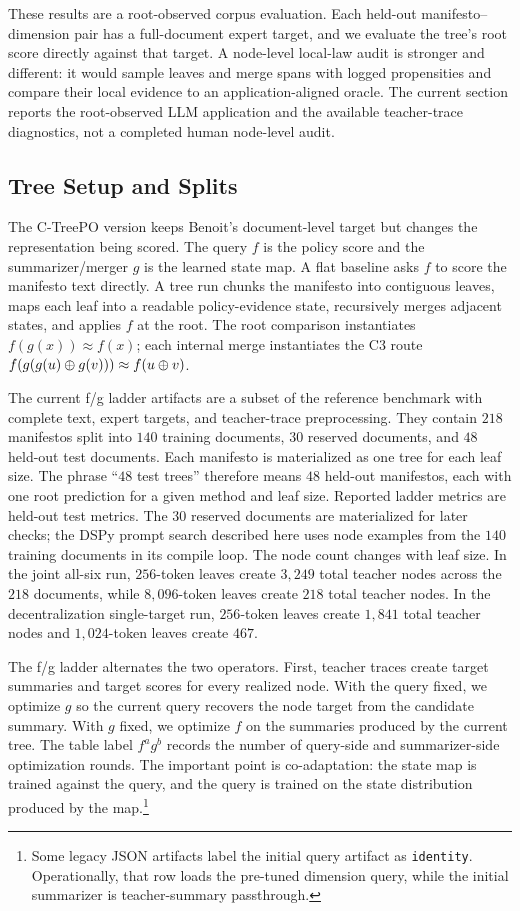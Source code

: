 These results are a root-observed corpus evaluation. Each held-out
manifesto--dimension pair has a full-document expert target, and we evaluate
the tree's root score directly against that target. A node-level local-law
audit is stronger and different: it would sample leaves and merge spans with
logged propensities and compare their local evidence to an application-aligned
oracle. The current section reports the root-observed LLM application and the
available teacher-trace diagnostics, not a completed human node-level audit.

\subsection{Tree Setup and Splits}\label{sec:min-manifesto-tree-setup}

The C-TreePO version keeps Benoit's document-level target but changes the
representation being scored. The query $f$ is the policy score and the
summarizer/merger $g$ is the learned state map. A flat baseline asks $f$ to
score the manifesto text directly. A tree run chunks the manifesto into
contiguous leaves, maps each leaf into a readable policy-evidence state,
recursively merges adjacent states, and applies $f$ at the root. The root
comparison instantiates $f(g(x))\approx f(x)$; each internal merge
instantiates the C3 route
$f(g(g(u)\oplus g(v)))\approx f(u\oplus v)$.

The current f/g ladder artifacts are a subset of the reference benchmark with
complete text, expert targets, and teacher-trace preprocessing. They contain
$218$ manifestos split into $140$ training documents, $30$ reserved documents,
and $48$ held-out test documents. Each manifesto is materialized as one tree
for each leaf size. The phrase ``$48$ test trees'' therefore means $48$
held-out manifestos, each with one root prediction for a given method and leaf
size. Reported ladder metrics are held-out test metrics. The $30$ reserved
documents are materialized for later checks; the DSPy prompt search described
here uses node examples from the $140$ training documents in its compile loop.
The node count changes with leaf size. In the joint all-six run, $256$-token
leaves create $3{,}249$ total teacher nodes across the $218$ documents, while
$8{,}096$-token leaves create $218$ total teacher nodes. In the
decentralization single-target run, $256$-token leaves create $1{,}841$ total
teacher nodes and $1{,}024$-token leaves create $467$.

The f/g ladder alternates the two operators. First, teacher traces create
target summaries and target scores for every realized node. With the query
fixed, we optimize $g$ so the current query recovers the node target from the
candidate summary. With $g$ fixed, we optimize $f$ on the summaries produced
by the current tree. The table label $f^a g^b$ records the number of
query-side and summarizer-side optimization rounds. The important point is
co-adaptation: the state map is trained against the query, and the query
is trained on the state distribution produced by the map.\footnote{Some
legacy JSON artifacts label the initial query artifact as
\texttt{identity}. Operationally, that row loads the pre-tuned dimension
query, while the initial summarizer is teacher-summary passthrough.}

